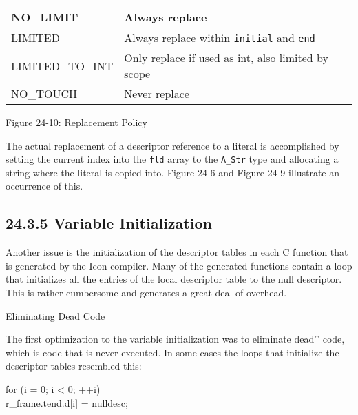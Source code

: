 \begin{center}
\tabletail{}
\tablelasttail{}
\begin{xtabular}{|m{1.4670599in}|m{3.2670598in}|}
\hline
{\ttfamily NO\_LIMIT} &
 Always replace\\\hline
{\ttfamily LIMITED} &
 Always replace within \texttt{initial} and \texttt{end}\\\hline
{\ttfamily LIMITED\_TO\_INT} &
 Only replace if used as int, also limited by scope\\\hline
{\ttfamily NO\_TOUCH} &
 Never replace\\\hline
\end{xtabular}
\end{center}
{\centering{}
Figure 24-10: Replacement Policy
\par}


The actual replacement of a descriptor reference to a literal is
accomplished by setting the current index into the \texttt{fld} array
to the \texttt{A\_Str} type and allocating a string where the literal
is copied into. Figure 24-6 and Figure 24-9 illustrate an occurrence
of this.

\subsection[24.3.5 Variable Initialization]{24.3.5 Variable Initialization}

Another issue is the initialization of the descriptor tables in each C
function that is generated by the Icon compiler.  Many of the
generated functions contain a loop that initializes all the entries of
the local descriptor table to the null descriptor. This is rather
cumbersome and generates a great deal of overhead.

{\sffamily
Eliminating Dead Code}


The first optimization to the variable initialization was to eliminate
{\textasciigrave}{\textasciigrave}dead'{}' code, which is code that is
never executed. In some cases the loops that initialize the
descriptor tables resembled this:

\goodbreak
\begin{iconcode}
for (i = 0; i < 0; ++i)\\
\>r\_frame.tend.d[i] = nulldesc;\\
\end{iconcode}


